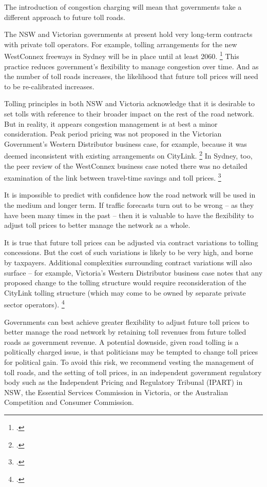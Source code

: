 \documentclass{grattan}
\begin{document}
The introduction of congestion charging will mean that governments take a different approach to future toll roads.

The NSW and Victorian governments at present hold very long-term contracts with private toll operators. For example, tolling arrangements for the new WestConnex freeways in Sydney will be in place until at least 2060.%
    \footcite{Ken-Kanofski-NSW-Legislative-Council-Inquiry-Road-Tolling-responses-to-supplementary-questions}
This practice reduces government's flexibility to manage congestion over time.
And as the number of toll roads increases, the likelihood that future toll prices will need to be re-calibrated increases.

Tolling principles in both NSW and Victoria acknowledge that it is desirable to set tolls with reference to their broader impact on the rest of the road network.
But in reality, it appears congestion management is at best a minor consideration. Peak period pricing was not proposed in the Victorian Government's Western Distributor business case, for example, because it was deemed inconsistent with existing arrangements on CityLink.%
    \footcite[][108]{Government2015WesternDistributor}
In Sydney, too, the peer review of the WestConnex business case noted there was no detailed examination of the link between travel-time savings and toll prices.%
    \footcite[][39]{SGS2016WestConnexreview}

It is impossible to predict with confidence how the road network will be used in the medium and longer term.
If traffic forecasts turn out to be wrong -- as they have been many times in the past -- then it is valuable to have the flexibility to adjust toll prices to better manage the network as a whole.

It is true that future toll prices can be adjusted via contract variations to tolling concessions. But the cost of such variations is likely to be very high, and borne by taxpayers. Additional complexities surrounding contract variations will also surface -- for example, Victoria's Western Distributor business case notes that any proposed change to the tolling structure would require reconsideration of the CityLink tolling structure (which may come to be owned by separate private sector operators).%
    \footcite[][113]{Government2015WesternDistributor}

Governments can best achieve greater flexibility to adjust future toll prices to better manage the road network by retaining toll revenues from future tolled roads as government revenue.
A potential downside, given road tolling is a politically charged issue, is that politicians may be tempted to change toll prices for political gain.
To avoid this risk, we recommend vesting the management of toll roads, and the setting of toll prices, in an independent government regulatory body such as the Independent Pricing and Regulatory Tribunal (IPART) in NSW, the Essential Services Commission in Victoria, or the Australian Competition and Consumer Commission.
\end{document}
